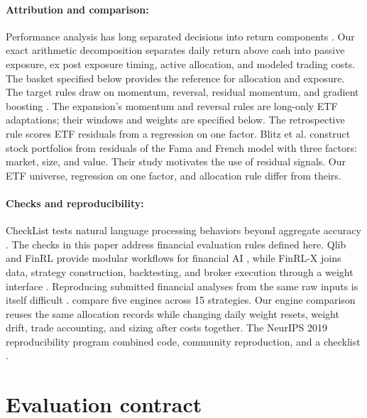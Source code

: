 \documentclass{article}
\begin{document}
\paragraph{Attribution and comparison:}
Performance analysis has long separated decisions into return components
\citep{fama1972components,brinson1985measuring}. Our exact arithmetic decomposition separates daily return above cash into passive exposure, ex post exposure timing, active allocation, and modeled trading costs. The basket specified below provides the reference for allocation and exposure. The target rules draw on momentum,
reversal, residual momentum, and gradient boosting
\citep{jegadeesh1993returns,moskowitz2012timeseries,lehmann1990fads,
blitz2011residual,friedman2001greedy}.
The expansion's momentum and reversal rules are long-only ETF adaptations;
their windows and weights are specified below. The retrospective rule scores ETF residuals from a
regression on one factor. Blitz et al. construct stock portfolios from residuals of the Fama and French model with three factors: market, size, and value. Their study motivates the use of residual signals. Our ETF universe, regression on one factor, and allocation rule differ from theirs.

\paragraph{Checks and reproducibility:}
CheckList tests natural language processing behaviors beyond aggregate accuracy
\citep{ribeiro2020checklist}. The checks in this paper address financial evaluation
rules defined here. Qlib and FinRL provide modular workflows for financial AI
\citep{yang2020qlib,liu2020finrl}, while FinRL-X joins data, strategy
construction, backtesting, and broker execution through a weight interface
\citep{yang2026finrlx}. Reproducing submitted financial analyses from the same
raw inputs is itself difficult \citep{perignon2024computational}.
\citet{yin2026implementation} compare five engines across 15 strategies. Our
engine comparison reuses the same allocation records while changing daily weight resets, weight drift, trade accounting, and sizing after costs together.
The NeurIPS 2019 reproducibility program combined code, community reproduction,
and a checklist \citep{pineau2021reproducibility}.

\section{Evaluation contract}
\end{document}
